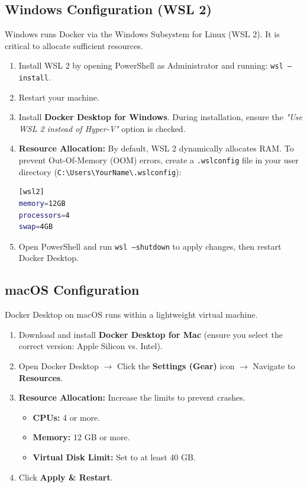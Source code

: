 \documentclass[12pt,a4paper]{article}
\begin{document}
\subsection{Windows Configuration (WSL 2)}
Windows runs Docker via the Windows Subsystem for Linux (WSL 2). It is critical to allocate sufficient resources.
\begin{enumerate}
    \item Install WSL 2 by opening PowerShell as Administrator and running: \texttt{wsl --install}.
    \item Restart your machine.
    \item Install \textbf{Docker Desktop for Windows}. During installation, ensure the \textit{"Use WSL 2 instead of Hyper-V"} option is checked.
    \item \textbf{Resource Allocation:} By default, WSL 2 dynamically allocates RAM. To prevent Out-Of-Memory (OOM) errors, create a \texttt{.wslconfig} file in your user directory (\texttt{C:\textbackslash Users\textbackslash YourName\textbackslash.wslconfig}):
\begin{lstlisting}[language=bash]
[wsl2]
memory=12GB
processors=4
swap=4GB
\end{lstlisting}
    \item Open PowerShell and run \texttt{wsl --shutdown} to apply changes, then restart Docker Desktop.
\end{enumerate}

\subsection{macOS Configuration}
Docker Desktop on macOS runs within a lightweight virtual machine.
\begin{enumerate}
    \item Download and install \textbf{Docker Desktop for Mac} (ensure you select the correct version: Apple Silicon vs. Intel).
    \item Open Docker Desktop $\rightarrow$ Click the \textbf{Settings (Gear)} icon $\rightarrow$ Navigate to \textbf{Resources}.
    \item \textbf{Resource Allocation:} Increase the limits to prevent crashes.
    \begin{itemize}
        \item \textbf{CPUs:} 4 or more.
        \item \textbf{Memory:} 12 GB or more.
        \item \textbf{Virtual Disk Limit:} Set to at least 40 GB.
    \end{itemize}
    \item Click \textbf{Apply \& Restart}.
\end{enumerate}
\end{document}
